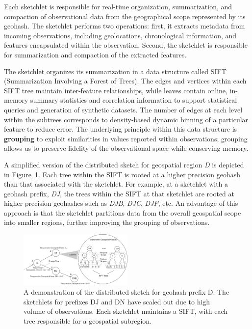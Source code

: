 \documentclass[9pt,journal,compsoc]{IEEEtran}
\begin{document}
Each sketchlet is responsible for real-time organization, summarization, and compaction of observational data from the geographical scope represented by its geohash. The sketchlet performs two operations: first, it extracts metadata from incoming observations, including geolocations, chronological information, and features encapsulated within the observation. Second, the sketchlet is responsible for summarization and compaction of the extracted features.

The sketchlet organizes its summarization in a data structure called SIFT (Summarization Involving a Forest of Trees). The edges and vertices within each SIFT tree maintain inter-feature relationships, while leaves contain online, in-memory summary statistics and correlation information to support statistical queries and generation of synthetic datasets.  The number of edges at each level within the subtrees corresponds to density-based dynamic binning of a particular feature to reduce error. The underlying principle within this data structure is \textbf{grouping} to exploit similarities in values reported within observations; grouping allows us to preserve fidelity of the observational space while conserving memory.

A simplified version of the distributed sketch for geospatial region \emph{D} is depicted in Figure~\ref{fig:dist-sketch}. Each tree within the SIFT is rooted at a higher precision geohash than that associated with the sketchlet. For example, at a sketchlet with a geohash prefix, \emph{DJ}, the trees within the SIFT at that sketchlet are rooted at higher precision geohashes such as \emph{DJB}, \emph{DJC}, \emph{DJF}, etc. An advantage of this approach is that the sketchlet partitions data from the overall geospatial scope into smaller regions, further improving the grouping of observations.

\begin{figure}
    \centerline{\includegraphics[width=0.5\textwidth]{figures/dist-sketch.pdf}}
    \caption{A demonstration of the distributed sketch for geohash prefix D. The sketchlets for prefixes DJ and DN have scaled out due to high volume of observations. Each sketchlet maintains a SIFT, with each tree responsible for a geospatial subregion. \vspace{-1em}}
    \label{fig:dist-sketch}
\end{figure}
\end{document}

